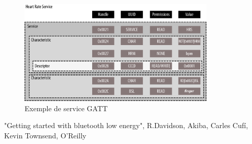 \begin{frame}
	\begin{figure}
		\includegraphics[height=5cm]{gatt.png}
		\caption{Exemple de service GATT}
	\end{figure}
{\tiny "Getting started with bluetooth low energy", R.Davidson, Akiba, Carles Cufí, Kevin Townsend, O'Reilly}
\end{frame}
